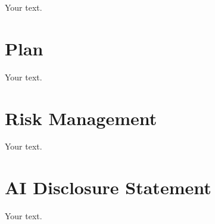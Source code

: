 \documentclass{article}
\begin{document}
Your text.

\section{Plan}

Your text.

\section{Risk Management}

Your text.




\appendix

\section{AI Disclosure Statement}

Your text.
\end{document}
